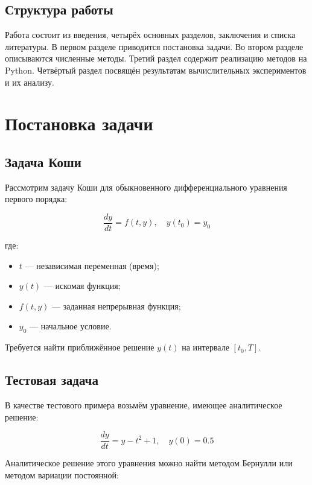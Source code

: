 \documentclass[a4paper,12pt]{article}
\begin{document}
\subsection*{Структура работы}
Работа состоит из введения, четырёх основных разделов, заключения и списка литературы. В первом разделе приводится постановка задачи. Во втором разделе описываются численные методы. Третий раздел содержит реализацию методов на Python. Четвёртый раздел посвящён результатам вычислительных экспериментов и их анализу.

\newpage

\section{Постановка задачи}

\subsection{Задача Коши}
Рассмотрим задачу Коши для обыкновенного дифференциального уравнения первого порядка:

\begin{equation}
    \frac{dy}{dt} = f(t, y), \quad y(t_0) = y_0 \label{eq:cauchy}
\end{equation}

где:
\begin{itemize}
    \item \(t\) — независимая переменная (время);
    \item \(y(t)\) — искомая функция;
    \item \(f(t, y)\) — заданная непрерывная функция;
    \item \(y_0\) — начальное условие.
\end{itemize}

Требуется найти приближённое решение \(y(t)\) на интервале \([t_0, T]\).

\subsection{Тестовая задача}
В качестве тестового примера возьмём уравнение, имеющее аналитическое решение:

\begin{equation}
    \frac{dy}{dt} = y - t^2 + 1, \quad y(0) = 0.5 \label{eq:example}
\end{equation}

Аналитическое решение этого уравнения можно найти методом Бернулли или методом вариации постоянной:
\end{document}
